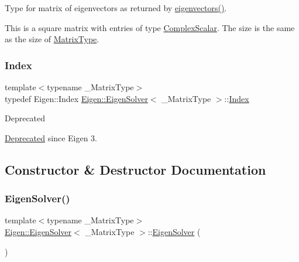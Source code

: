 Type for matrix of eigenvectors as returned by \mbox{\hyperlink{class_eigen_1_1_eigen_solver_a66288022802172e3ee059283b26201d7}{eigenvectors()}}. 

This is a square matrix with entries of type \mbox{\hyperlink{class_eigen_1_1_eigen_solver_a4d0b2a773357d0a6ec98e026f04002ed}{Complex\+Scalar}}. The size is the same as the size of \mbox{\hyperlink{class_eigen_1_1_eigen_solver_a83acd180404ddaac8a678fa65a6b632b}{Matrix\+Type}}. \mbox{\label{class_eigen_1_1_eigen_solver_a5bff6a6bc0efac67d52c60c2c3deb9ee}} 
\subsubsection{\texorpdfstring{Index}{Index}}
{\footnotesize\ttfamily template$<$typename \+\_\+\+Matrix\+Type$>$ \\
typedef Eigen\+::\+Index \mbox{\hyperlink{class_eigen_1_1_eigen_solver}{Eigen\+::\+Eigen\+Solver}}$<$ \+\_\+\+Matrix\+Type $>$\+::\mbox{\hyperlink{class_eigen_1_1_eigen_solver_a5bff6a6bc0efac67d52c60c2c3deb9ee}{Index}}}

\begin{DoxyRefDesc}{Deprecated}
\item[\mbox{\hyperlink{deprecated__deprecated000018}{Deprecated}}]since Eigen 3. \end{DoxyRefDesc}


\subsection{Constructor \& Destructor Documentation}
\mbox{\label{class_eigen_1_1_eigen_solver_a3af22d721a6401365881b2ef252d26aa}} 
\subsubsection{\texorpdfstring{EigenSolver()}{EigenSolver()}\hspace{0.1cm}{\footnotesize\ttfamily [1/3]}}
{\footnotesize\ttfamily template$<$typename \+\_\+\+Matrix\+Type$>$ \\
\mbox{\hyperlink{class_eigen_1_1_eigen_solver}{Eigen\+::\+Eigen\+Solver}}$<$ \+\_\+\+Matrix\+Type $>$\+::\mbox{\hyperlink{class_eigen_1_1_eigen_solver}{Eigen\+Solver}} (\begin{DoxyParamCaption}{ }\end{DoxyParamCaption})\hspace{0.3cm}{\ttfamily [inline]}}



